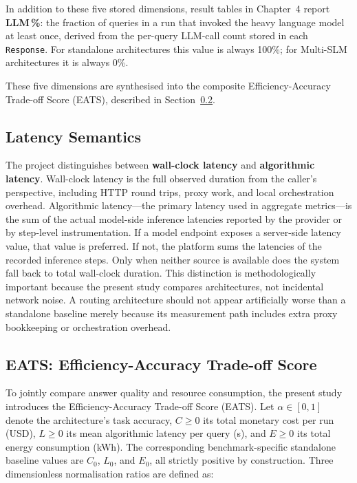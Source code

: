 In addition to these five stored dimensions, result tables in Chapter~4 report \textbf{LLM\,\%}: the fraction of queries in a run that invoked the heavy language model at least once, derived from the per-query LLM-call count stored in each \texttt{Response}. For standalone architectures this value is always 100\%; for Multi-SLM architectures it is always 0\%.

These five dimensions are synthesised into the composite Efficiency-Accuracy Trade-off Score (EATS), described in Section~\ref{sec:eats}.

\subsection{Latency Semantics}
\label{sec:latency}

The project distinguishes between \textbf{wall-clock latency} and \textbf{algorithmic latency}. Wall-clock latency is the full observed duration from the caller's perspective, including HTTP round trips, proxy work, and local orchestration overhead. Algorithmic latency---the primary latency used in aggregate metrics---is the sum of the actual model-side inference latencies reported by the provider or by step-level instrumentation. If a model endpoint exposes a server-side latency value, that value is preferred. If not, the platform sums the latencies of the recorded inference steps. Only when neither source is available does the system fall back to total wall-clock duration. This distinction is methodologically important because the present study compares architectures, not incidental network noise. A routing architecture should not appear artificially worse than a standalone baseline merely because its measurement path includes extra proxy bookkeeping or orchestration overhead.

\subsection{EATS: Efficiency-Accuracy Trade-off Score}
\label{sec:eats}

To jointly compare answer quality and resource consumption, the present study introduces the Efficiency-Accuracy Trade-off Score (EATS). Let $\alpha \in [0,1]$ denote the architecture's task accuracy, $C \geq 0$ its total monetary cost per run (USD), $L \geq 0$ its mean algorithmic latency per query (s), and $E \geq 0$ its total energy consumption (kWh). The corresponding benchmark-specific standalone baseline values are $C_0$, $L_0$, and $E_0$, all strictly positive by construction. Three dimensionless normalisation ratios are defined as:

